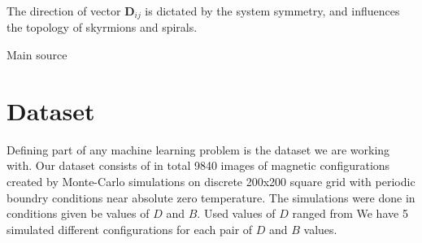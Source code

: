 The direction of vector $\bm{D}_{ij}$ is dictated by the system symmetry, and influences the topology of skyrmions and spirals.

Main source \cite{li2023magnetic}



\section{Dataset}


Defining part of any machine learning problem is the dataset we are working with. Our dataset consists of in total 9840 images of magnetic configurations created by Monte-Carlo simulations on discrete 200x200 square grid with periodic boundry conditions near absolute zero temperature. The simulations were done in conditions given be values of $D$ and $B$. Used values of $D$ ranged from We have 5 simulated different configurations for each pair of $D$ and $B$ values.





